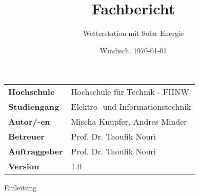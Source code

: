 \documentclass[final]{fhnwreport}       %
\title{\Huge{\textbf{Fachbericht}}\\}          %
\author{\huge{Wetterstation mit Solar Energie}}          %
\date{Windisch, \today}             %
\begin{document}
\maketitle
\vspace*{-0.5cm}						    %
\vfill
\begin{figure}[H]
\centering
\end{figure}
\vfill

{
\renewcommand\arraystretch{2}
\begin{center}
\begin{tabular}{>{\bf}p{4cm} l}
Hochschule                 &    Hochschule für Technik - FHNW\\
Studiengang                &    Elektro- und Informationstechnik\\
Autor/-en  		           & 	Mischa Knupfer, Andres Minder\\
Betreuer                   &    Prof. Dr. Taoufik Nouri\\
Auftraggeber               &    Prof. Dr. Taoufik Nouri\\
Version                    &    1.0 %
\end{tabular}
\end{center}
}

\clearpage
			
\thispagestyle{empty}


\tableofcontents
\clearpage

Einleitung









\end{document}
